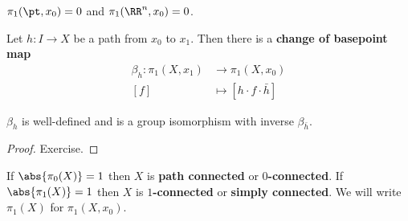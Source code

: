 \begin{exam}
	$\pi_1(\pt,x_0)=0$ and $\pi_1(\RR^n,x_0)=0$.
\end{exam}

\begin{defn}
	Let $h:I \to X$ be a path from $x_0$ to $x_1$.
	Then there is a \textbf{change of basepoint map}
	\begin{align*}
		\beta_h: \pi_1(X,x_1) &\to \pi_1(X,x_0) \\
		[f] &\mapsto [h \cdot f \cdot \bar{h}]
	\end{align*}
\end{defn}

\begin{prop}
	$\beta_h$ is well-defined and is a group isomorphism with inverse $\beta_{\bar{h}}$.
\end{prop}

\begin{proof}
	Exercise.
\end{proof}

\begin{rmk}
	If $\abs{\pi_0(X)}=1$ then $X$ is \textbf{path connected} or \textbf{$0$-connected}.
	If $\abs{\pi_1(X)}=1$ then $X$ is \textbf{$1$-connected} or \textbf{simply connected}.
	We will write $\pi_1(X)$ for $\pi_1(X,x_0)$.
\end{rmk}
